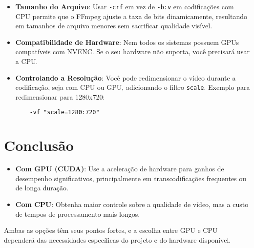 \documentclass{article}
\begin{document}
\begin{itemize}
    \item \textbf{Tamanho do Arquivo}: Usar \texttt{-crf} em vez de \texttt{-b:v} em codificações com CPU permite que o FFmpeg ajuste a taxa de bits dinamicamente, resultando em tamanhos de arquivo menores sem sacrificar qualidade visível.
    
    \item \textbf{Compatibilidade de Hardware}: Nem todos os sistemas possuem GPUs compatíveis com NVENC. Se o seu hardware não suporta, você precisará usar a CPU.
    
    \item \textbf{Controlando a Resolução}: Você pode redimensionar o vídeo durante a codificação, seja com CPU ou GPU, adicionando o filtro \texttt{scale}. Exemplo para redimensionar para 1280x720:
    \begin{lstlisting}
    -vf "scale=1280:720"
    \end{lstlisting}
\end{itemize}

\section{Conclusão}

\begin{itemize}
    \item \textbf{Com GPU (CUDA)}: Use a aceleração de hardware para ganhos de desempenho significativos, principalmente em transcodificações frequentes ou de longa duração.
    \item \textbf{Com CPU}: Obtenha maior controle sobre a qualidade de vídeo, mas a custo de tempos de processamento mais longos.
\end{itemize}

Ambas as opções têm seus pontos fortes, e a escolha entre GPU e CPU dependerá das necessidades específicas do projeto e do hardware disponível.
\end{document}
